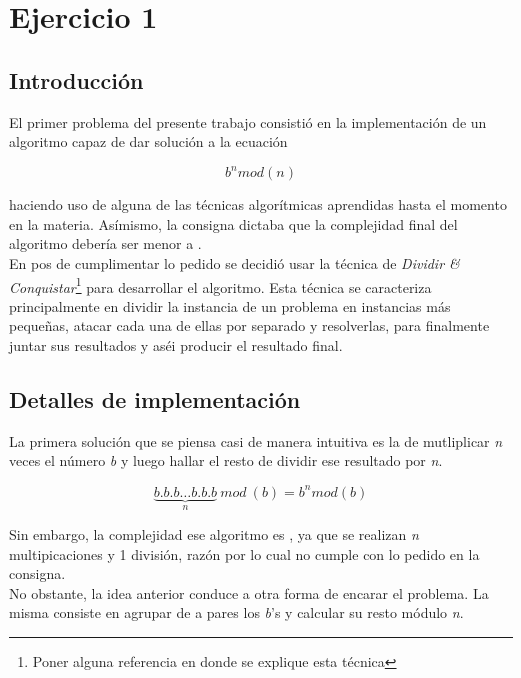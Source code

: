 \section*{Ejercicio 1}

\subsection*{Introducción}
	El primer problema del presente trabajo consistió en la implementación de un algoritmo capaz de dar solución a la ecuación 

	\begin{equation} 
		b^n mod (n) 
	\end{equation} 

haciendo uso de alguna de las técnicas algorítmicas aprendidas hasta el momento en la materia. Asímismo, la consigna dictaba que la complejidad final del algoritmo debería ser menor a .\\
	En pos de cumplimentar lo pedido se decidió usar la técnica de \textit{Dividir \& Conquistar}\footnote{Poner alguna referencia 	en donde se explique esta técnica} para desarrollar el algoritmo. Esta técnica se caracteriza principalmente en dividir la instancia de un problema en instancias más pequeñas, atacar cada una de ellas por separado y resolverlas, para finalmente juntar sus resultados y aséi producir el resultado final.

\subsection*{Detalles de implementación}
	La primera solución que se piensa casi de manera intuitiva es la de mutliplicar \textit{n} veces el número \textit{b} y luego hallar el resto de dividir ese resultado por \textit{n}. 

	\begin{equation}
		\underbrace{b.b.b \hdots b.b.b}_{n}\ mod\ (b)  = b^n mod (b)
	\end{equation}

	Sin embargo, la complejidad ese algoritmo es , ya que se realizan \textit{n} multipicaciones y 1 división, razón por lo cual no cumple con lo pedido en la consigna.\\

	No obstante, la idea anterior conduce a otra forma de encarar el problema. La misma consiste en agrupar de a pares los \textit{b}'s y calcular su resto módulo \textit{n}.

